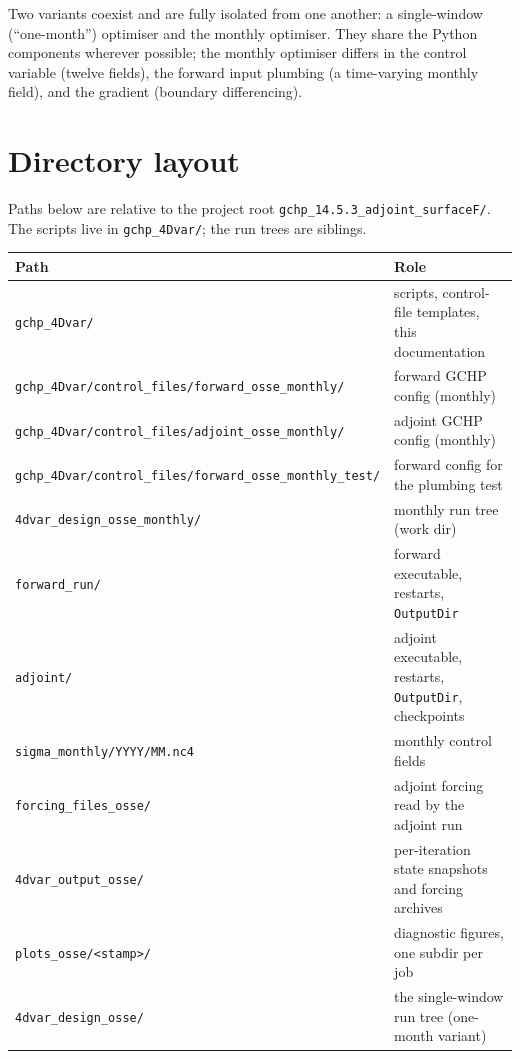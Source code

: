 \documentclass[11pt]{article}
\newcommand{\code}[1]{\texttt{#1}}
\begin{document}
Two variants coexist and are fully isolated from one another: a single-window
(``one-month'') optimiser and the monthly optimiser. They share the Python
components wherever possible; the monthly optimiser differs in the control
variable (twelve fields), the forward input plumbing (a time-varying monthly
field), and the gradient (boundary differencing).

\section{Directory layout}

Paths below are relative to the project root
\code{gchp\_14.5.3\_adjoint\_surfaceF/}. The scripts live in \code{gchp\_4Dvar/};
the run trees are siblings.

\begin{center}
\small
\begin{longtable}{@{}p{}p{}@{}}
\toprule
Path & Role \\
\midrule
\endhead
\code{gchp\_4Dvar/} & scripts, control-file templates, this documentation \\
\code{gchp\_4Dvar/control\_files/forward\_osse\_monthly/} & forward GCHP config (monthly) \\
\code{gchp\_4Dvar/control\_files/adjoint\_osse\_monthly/} & adjoint GCHP config (monthly) \\
\code{gchp\_4Dvar/control\_files/forward\_osse\_monthly\_test/} & forward config for the plumbing test \\
\code{4dvar\_design\_osse\_monthly/} & monthly run tree (work dir) \\
\quad \code{forward\_run/} & forward executable, restarts, \code{OutputDir} \\
\quad \code{adjoint/} & adjoint executable, restarts, \code{OutputDir}, checkpoints \\
\quad \code{sigma\_monthly/YYYY/MM.nc4} & monthly control fields \\
\quad \code{forcing\_files\_osse/} & adjoint forcing read by the adjoint run \\
\quad \code{4dvar\_output\_osse/} & per-iteration state snapshots and forcing archives \\
\quad \code{plots\_osse/<stamp>/} & diagnostic figures, one subdir per job \\
\code{4dvar\_design\_osse/} & the single-window run tree (one-month variant) \\
\bottomrule
\end{longtable}
\end{center}
\end{document}
